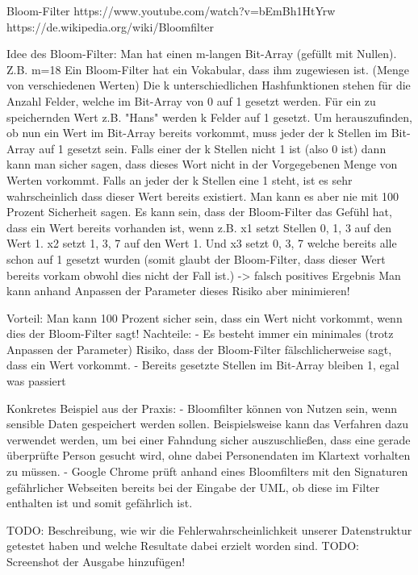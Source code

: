 \documentclass[11 pt]{scrartcl}
\begin{document}
Bloom-Filter
https://www.youtube.com/watch?v=bEmBh1HtYrw
https://de.wikipedia.org/wiki/Bloomfilter

Idee des Bloom-Filter:
Man hat einen m-langen Bit-Array (gefüllt mit Nullen). Z.B. m=18
Ein Bloom-Filter hat ein Vokabular, dass ihm zugewiesen ist. (Menge von verschiedenen Werten)
Die k unterschiedlichen Hashfunktionen stehen für die Anzahl Felder, welche im Bit-Array von 0 auf 1 gesetzt werden.
Für ein zu speichernden Wert z.B. "Hans" werden k Felder auf 1 gesetzt.
Um herauszufinden, ob nun ein Wert im Bit-Array bereits vorkommt, muss jeder der k Stellen im Bit-Array auf 1 gesetzt sein. Falls einer der k Stellen nicht 1 ist (also 0 ist) dann kann man sicher sagen, dass dieses Wort nicht in der Vorgegebenen Menge von Werten vorkommt.
Falls an jeder der k Stellen eine 1 steht, ist es sehr wahrscheinlich dass dieser Wert bereits existiert. Man kann es aber nie mit 100 Prozent Sicherheit sagen.
Es kann sein, dass der Bloom-Filter das Gefühl hat, dass ein Wert bereits vorhanden ist, wenn z.B. x1 setzt Stellen 0, 1, 3 auf den Wert 1. x2 setzt 1, 3, 7 auf den Wert 1. Und x3 setzt 0, 3, 7 welche bereits alle schon auf 1 gesetzt wurden (somit glaubt der Bloom-Filter, dass dieser Wert bereits vorkam obwohl dies nicht der Fall ist.) -> falsch positives Ergebnis
Man kann anhand Anpassen der Parameter dieses Risiko aber minimieren!

Vorteil: Man kann 100 Prozent sicher sein, dass ein Wert nicht vorkommt, wenn dies der Bloom-Filter sagt!
Nachteile:
- Es besteht immer ein minimales (trotz Anpassen der Parameter) Risiko, dass der Bloom-Filter fälschlicherweise sagt, dass ein Wert vorkommt.
- Bereits gesetzte Stellen im Bit-Array bleiben 1, egal was passiert

Konkretes Beispiel aus der Praxis:
- Bloomfilter können von Nutzen sein, wenn sensible Daten gespeichert werden sollen. Beispielsweise kann das Verfahren dazu verwendet werden, um bei einer Fahndung sicher auszuschließen, dass eine gerade überprüfte Person gesucht wird, ohne dabei Personendaten im Klartext vorhalten zu müssen.
- Google Chrome prüft anhand eines Bloomfilters mit den Signaturen gefährlicher Webseiten bereits bei der Eingabe der UML, ob diese im Filter enthalten ist und somit gefährlich ist.

TODO: Beschreibung, wie wir die Fehlerwahrscheinlichkeit unserer Datenstruktur getestet haben und welche Resultate dabei erzielt worden sind.
TODO: Screenshot der Ausgabe hinzufügen!
\end{document}

